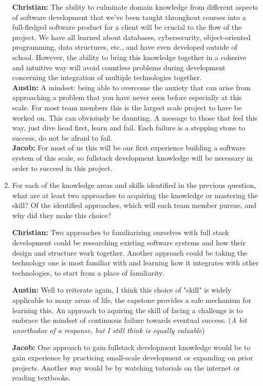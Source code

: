 \documentclass[12pt]{article}
\begin{document}
\begin{enumerate}
  \textbf{Christian:} The ability to culminate domain knowledge from different aspects of software development that we’ve been taught throughout courses into a full-fledged software product for a client will be crucial to the flow of the project. We have all learned about databases, cybersecurity, object-oriented programming, data structures, etc., and have even developed outside of school. However, the ability to bring this knowledge together in a cohesive and intuitive way will avoid countless problems during development concerning the integration of multiple technologies together.\\

  \textbf{Austin: } A mindset: being able to overcome the anxiety that can arise from approaching a problem that you have never seen before especially at this scale. For most team members this is the largest scale project to have be worked on. This can obvioiusly be daunting. A message to those that feel this way, just dive head first, learn and fail. Each failure is a stepping stone to success, do not be afraid to fail. \\
  
  \textbf{Jacob: } For most of us this will be our first experience building a software system of this scale, so fullstack development knowledge will be necessary in order to succeed in this project.

  \item For each of the knowledge areas and skills identified in the previous
  question, what are at least two approaches to acquiring the knowledge or
  mastering the skill?  Of the identified approaches, which will each team
  member pursue, and why did they make this choice?

  \textbf{Christian:} Two approaches to familiarizing ourselves with full stack development could be researching existing software systems and how their design and structure work together. Another approach could be taking the technology one is most familiar with and learning how it integrates with other technologies, to start from a place of familiarity.

  \textbf{Austin: } Well to reiterate again, I think this choice of "skill" is widely applicable to many areas of life, the capstone provides a safe mechanism for learning this. An approach to aquiring the skill of facing a challenge is to embrace the mindset of continuous failure towards eventual success. (\textit{A bit unorthodox of a response, but I still think is equally valuable})
  
  \textbf{Jacob: } One approach to gain fullstack development knowledge would be to gain experience by practicing small-scale development or expanding on prior projects. Another way would be by watching tutorials on the internet or reading textbooks.
  
\end{enumerate}
\end{document}
